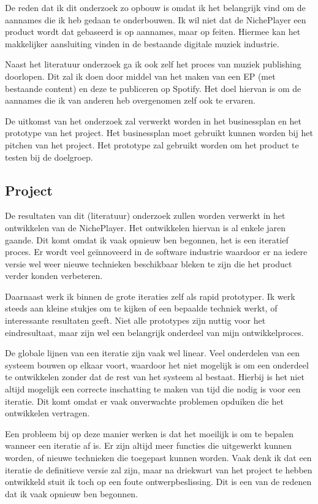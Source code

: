 De reden dat ik dit onderzoek zo opbouw is omdat ik het belangrijk vind om de aannames die ik heb gedaan te onderbouwen. Ik wil niet dat de NichePlayer een product wordt dat gebaseerd is op aannames, maar op feiten. Hiermee kan het makkelijker aansluiting vinden in de bestaande digitale muziek industrie.

Naast het literatuur onderzoek ga ik ook zelf het proces van muziek publishing doorlopen. Dit zal ik doen door middel van het maken van een EP (met bestaande content) en deze te publiceren op Spotify. Het doel hiervan is om de aannames die ik van anderen heb overgenomen zelf ook te ervaren.

De uitkomst van het onderzoek zal verwerkt worden in het businessplan en het prototype van het project. Het businessplan moet gebruikt kunnen worden bij het pitchen van het project. Het prototype zal gebruikt worden om het product te testen bij de doelgroep.

\subsection{Project}
De resultaten van dit (literatuur) onderzoek zullen worden verwerkt in het ontwikkelen van de NichePlayer. Het ontwikkelen hiervan is al enkele jaren gaande. Dit komt omdat ik vaak opnieuw ben begonnen, het is een iteratief proces. Er wordt veel geïnnoveerd in de software industrie waardoor er na iedere versie wel weer nieuwe technieken beschikbaar bleken te zijn die het product verder konden verbeteren. 

Daarnaast werk ik binnen de grote iteraties zelf als rapid prototyper. Ik werk steeds aan kleine stukjes om te kijken of een bepaalde techniek werkt, of interessante resultaten geeft. Niet alle prototypes zijn nuttig voor het eindresultaat, maar zijn wel een belangrijk onderdeel van mijn ontwikkelproces.

De globale lijnen van een iteratie zijn vaak wel linear. Veel onderdelen van een systeem bouwen op elkaar voort, waardoor het niet mogelijk is om een onderdeel te ontwikkelen zonder dat de rest van het systeem al bestaat. Hierbij is het niet altijd mogelijk een correcte inschatting te maken van tijd die nodig is voor een iteratie. Dit komt omdat er vaak onverwachte problemen opduiken die het ontwikkelen vertragen.

Een probleem bij op deze manier werken is dat het moeilijk is om te bepalen wanneer een iteratie af is. Er zijn altijd meer functies die uitgewerkt kunnen worden, of nieuwe technieken die toegepast kunnen worden. Vaak denk ik dat een iteratie de definitieve versie zal zijn, maar na driekwart van het project te hebben ontwikkeld stuit ik toch op een foute ontwerpbeslissing. Dit is een van de redenen dat ik vaak opnieuw ben begonnen.


